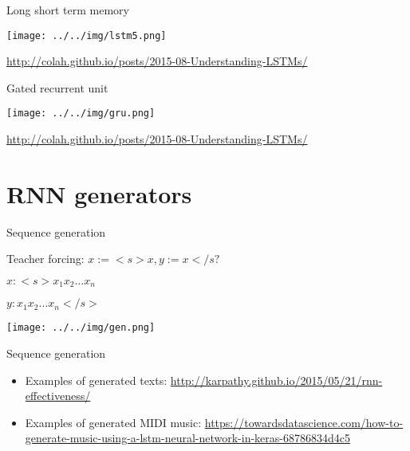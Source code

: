 \documentclass[usenames,dvipsnames,handout,aspectratio=169]{beamer}
\begin{document}
\begin{frame}{Long short term memory}
\begin{center}
\texttt{[image: ../../img/lstm5.png]}
\end{center}

\url{http://colah.github.io/posts/2015-08-Understanding-LSTMs/}	
\end{frame}

\begin{frame}{Gated recurrent unit}
\begin{center}
\texttt{[image: ../../img/gru.png]}
\end{center}

\url{http://colah.github.io/posts/2015-08-Understanding-LSTMs/}	
\end{frame}

\section{RNN generators}

\begin{frame}{Sequence generation}

Teacher forcing: $x := <s> x, y := x </s?$

$x : <s> x_1 x_2 \ldots x_n$

$y : x_1 x_2 \ldots x_n </s>$

\begin{center}
\texttt{[image: ../../img/gen.png]}
\end{center}




\end{frame}


\begin{frame}{Sequence generation}
\begin{itemize}
	\item Examples of generated texts: \url{http://karpathy.github.io/2015/05/21/rnn-effectiveness/}
	\item Examples of generated MIDI music: \url{https://towardsdatascience.com/how-to-generate-music-using-a-lstm-neural-network-in-keras-68786834d4c5}

\end{itemize}	
\end{frame}
\end{document}
